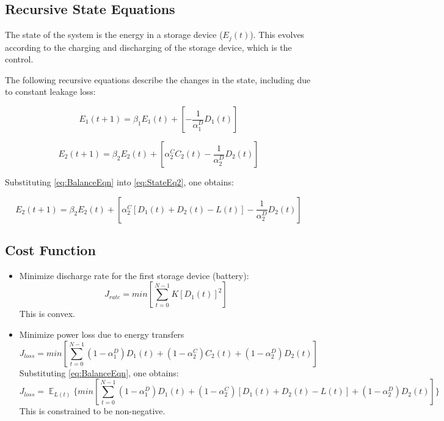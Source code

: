 \documentclass{article}
\DeclareMathOperator{\E}{\mathbb{E}}
\begin{document}
	\subsection{Recursive State Equations}
	The state of the system is the energy in a storage device ($E_{j}(t)$). This evolves according to the charging and discharging of the storage device, which is the control.
	
	The following recursive equations describe the changes in the state, including due to constant leakage loss:
	
	\begin{equation}\label{eq:StateEq1}E_{1}(t+1)=\beta_{1}E_{1}(t)+\left[-\frac{1}{\alpha_{1}^{D}}D_{1}(t)\right] \end{equation}
	
	\begin{equation}\label{eq:StateEq2}E_{2}(t+1)=\beta_{2}E_{2}(t)+\left[\alpha_{2}^{C}C_{2}(t)-\frac{1}{\alpha_{2}^{D}}D_{2}(t)\right]\end{equation}
	
	Substituting \eqref{eq:BalanceEqn} into \eqref{eq:StateEq2}, one obtains:
	
	\begin{equation}\label{eq:DPStateEq2}E_{2}(t+1)=\beta_{2}E_{2}(t)+\left[\alpha_{2}^{C}[D_{1}(t)+D_{2}(t)-L(t)]-\frac{1}{\alpha_{2}^{D}}D_{2}(t)\right]\end{equation}
	
	
	\subsection{Cost Function}
	\begin{itemize}
		\item Minimize discharge rate
		for the first storage device (battery):
		\begin{equation}J_{rate}=min\left[\sum_{t=0}^{N-1}K\left[D_{1}(t)\right]^{2}\right]\end{equation}
		This is convex.
		\item Minimize power loss due to energy transfers
		\begin{equation}J_{loss}=min\left[\sum_{t=0}^{N-1}
		(1-\alpha_{1}^{D})D_{1}(t)+
		(1-\alpha_{2}^{C})C_{2}(t)+
		(1-\alpha_{2}^{D})D_{2}(t)
		\right]\end{equation}
		Substituting \eqref{eq:BalanceEqn}, one obtains:
		\begin{equation}J_{loss}=\mathop{\E}_{L(t)} \Biggl\{min\left[\sum_{t=0}^{N-1}
		(1-\alpha_{1}^{D})D_{1}(t)+
		(1-\alpha_{2}^{C})[D_{1}(t)+D_{2}(t)-L(t)]+
		(1-\alpha_{2}^{D})D_{2}(t)
		\right]\Biggr\}\end{equation}
		This is constrained to be non-negative.
	\end{itemize}
	
\end{document}
